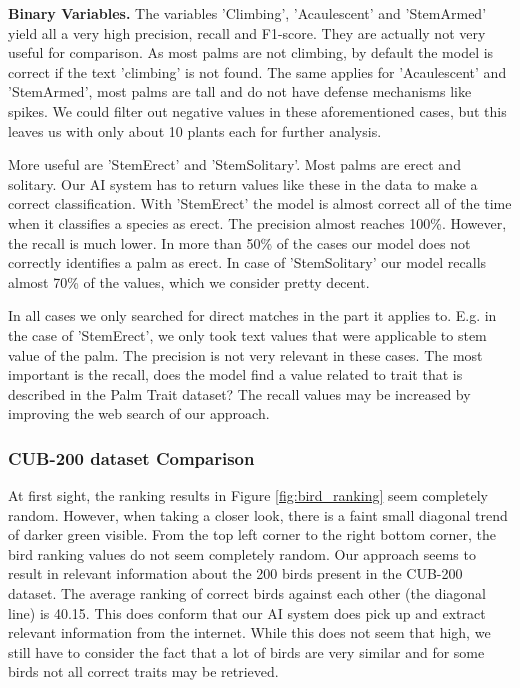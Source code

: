 \documentclass[a4paper, 12pt, oneside]{book} %
\begin{document}
\noindent
\newline
\textbf{Binary Variables.}
The variables 'Climbing', 'Acaulescent' and 'StemArmed' yield all a very high precision, recall and F1-score.
They are actually not very useful for comparison.
As most palms are not climbing, by default the model is correct if the text 'climbing' is not found. 
The same applies for 'Acaulescent' and 'StemArmed', most palms are tall and do not have defense mechanisms like spikes.
We could filter out negative values in these aforementioned cases, but this leaves us with only about 10 plants each for further analysis.

More useful are 'StemErect' and 'StemSolitary'.
Most palms are erect and solitary. 
Our AI system has to return values like these in the data to make a correct classification.
With 'StemErect' the model is almost correct all of the time when it classifies a species as erect.
The precision almost reaches 100\%.
However, the recall is much lower. 
In more than 50\% of the cases our model does not correctly identifies a palm as erect.
In case of 'StemSolitary' our model recalls almost 70\% of the values, which we consider pretty decent.

In all cases we only searched for direct matches in the part it applies to.
E.g. in the case of 'StemErect', we only took text values that were applicable to stem value of the palm.
The precision is not very relevant in these cases.
The most important is the recall, does the model find a value related to trait that is described in the Palm Trait dataset?
The recall values may be increased by improving the web search of our approach.

\subsubsection{CUB-200 dataset Comparison}
At first sight, the ranking results in Figure \ref{fig:bird_ranking} seem completely random.
However, when taking a closer look, there is a faint small diagonal trend of darker green visible.
From the top left corner to the right bottom corner, the bird ranking values do not seem completely random.
Our approach seems to result in relevant information about the 200 birds present in the CUB-200 dataset.
The average ranking of correct birds against each other (the diagonal line) is 40.15.
This does conform that our AI system does pick up and extract relevant information from the internet.
While this does not seem that high, we still have to consider the fact that a lot of birds are very similar and for some birds not all correct traits may be retrieved.
\end{document}
